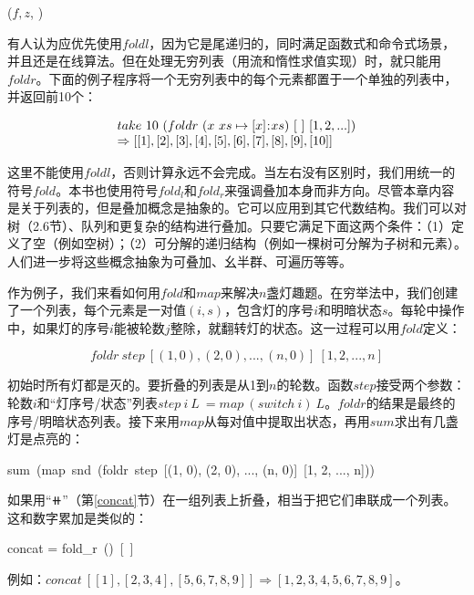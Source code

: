 \documentclass[b5paper]{ctexart}
\begin{document}
\begin{algorithmic}[1]
  \State \Return {}($f, z$, )
\EndFunction
\end{algorithmic}

有人认为应优先使用$foldl$，因为它是尾递归的，同时满足函数式和命令式场景，并且还是在线算法。但在处理无穷列表（用流和惰性求值实现）时，就只能用$foldr$。下面的例子程序将一个无穷列表中的每个元素都置于一个单独的列表中，并返回前10个：

\[
\begin{array}{l}
take\ 10\ (foldr\ (x\ xs \mapsto [x] \mathbin{\!:\!} xs)\ [\ ]\ [1, 2, ...]) \\
\Rightarrow [[1], [2], [3], [4], [5], [6], [7], [8], [9], [10]]
\end{array}
\]

这里不能使用$foldl$，否则计算永远不会完成。当左右没有区别时，我们用统一的符号$fold$。本书也使用符号$fold_l$和$fold_r$来强调叠加本身而非方向。尽管本章内容是关于列表的，但是叠加概念是抽象的。它可以应用到其它代数结构。我们可以对树（\cite{unplugged}2.6节）、队列和更复杂的结构进行叠加。只要它满足下面这两个条件：（1）定义了空（例如空树）；（2）可分解的递归结构（例如一棵树可分解为子树和元素）。人们进一步将这些概念抽象为可叠加、幺半群、可遍历等等。

作为例子，我们来看如何用$fold$和$map$来解决$n$盏灯趣题。在穷举法中，我们创建了一个列表，每个元素是一对值$(i, s)$，包含灯的序号$i$和明暗状态$s$。每轮中操作中，如果灯的序号$i$能被轮数$j$整除，就翻转灯的状态。这一过程可以用$fold$定义：

\[
foldr\ step\ [(1, 0), (2, 0), ..., (n, 0)]\ [1, 2, ..., n]
\]

初始时所有灯都是灭的。要折叠的列表是从1到$n$的轮数。函数$step$接受两个参数：轮数$i$和“灯序号/状态”列表$step\ i\ L\ = map\ (switch\ i)\ L$。$foldr$的结果是最终的序号/明暗状态列表。接下来用$map$从每对值中提取出状态，再用$sum$求出有几盏灯是点亮的：

\be
sum\ (map\ snd\ (foldr\ step\ [(1, 0), (2, 0), ..., (n, 0)]\ [1, 2, ..., n]))
\ee

如果用“$\doubleplus$”（第\ref{concat}节）在一组列表上折叠，相当于把它们串联成一个列表。这和数字累加是类似的：

\be
concat = fold_r\ (\doubleplus)\ [\ ]
\ee

例如：$concat\ [[1], [2, 3, 4], [5, 6, 7, 8, 9]] \Rightarrow [1, 2, 3, 4, 5, 6, 7, 8, 9]$。

\begin{Exercise}
\end{Exercise}
\end{document}
